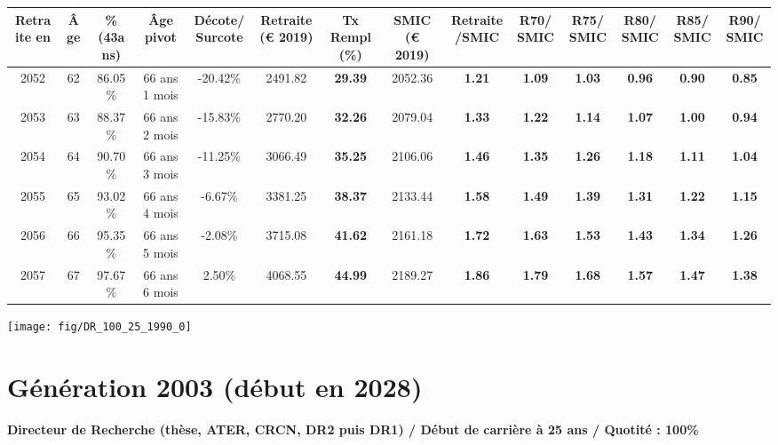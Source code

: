 \begin{adjustbox}{max width=\textwidth} 
\begin{tabular}[htb]{|c|c||c|c|c||c|c||c|c||c|c|c|c|c|} 
\hline 
 Retraite en &  Âge &  \%(43ans) &  Âge pivot &  Décote/Surcote &  Retraite (\euro{} 2019) &  Tx Rempl(\%) &  SMIC (\euro{} 2019) &  Retraite/SMIC &  R70/SMIC &  R75/SMIC &  R80/SMIC &  R85/SMIC &  R90/SMIC \\ 
\hline \hline 
 2052 &  62 &  86.05\% &  66 ans 1 mois &  -20.42\% &  2491.82 &  {\bf 29.39} &  2052.36 &  {\bf 1.21} &  {\bf 1.09} &  {\bf 1.03} &  {\bf {\color{red} 0.96}} &  {\bf {\color{red} 0.90}} &  {\bf {\color{red} 0.85}} \\ 
\hline 
 2053 &  63 &  88.37\% &  66 ans 2 mois &  -15.83\% &  2770.20 &  {\bf 32.26} &  2079.04 &  {\bf 1.33} &  {\bf 1.22} &  {\bf 1.14} &  {\bf 1.07} &  {\bf 1.00} &  {\bf {\color{red} 0.94}} \\ 
\hline 
 2054 &  64 &  90.70\% &  66 ans 3 mois &  -11.25\% &  3066.49 &  {\bf 35.25} &  2106.06 &  {\bf 1.46} &  {\bf 1.35} &  {\bf 1.26} &  {\bf 1.18} &  {\bf 1.11} &  {\bf 1.04} \\ 
\hline 
 2055 &  65 &  93.02\% &  66 ans 4 mois &  -6.67\% &  3381.25 &  {\bf 38.37} &  2133.44 &  {\bf 1.58} &  {\bf 1.49} &  {\bf 1.39} &  {\bf 1.31} &  {\bf 1.22} &  {\bf 1.15} \\ 
\hline 
 2056 &  66 &  95.35\% &  66 ans 5 mois &  -2.08\% &  3715.08 &  {\bf 41.62} &  2161.18 &  {\bf 1.72} &  {\bf 1.63} &  {\bf 1.53} &  {\bf 1.43} &  {\bf 1.34} &  {\bf 1.26} \\ 
\hline 
 2057 &  67 &  97.67\% &  66 ans 6 mois &  2.50\% &  4068.55 &  {\bf 44.99} &  2189.27 &  {\bf 1.86} &  {\bf 1.79} &  {\bf 1.68} &  {\bf 1.57} &  {\bf 1.47} &  {\bf 1.38} \\ 
\hline 
\hline 
\end{tabular} 
\end{adjustbox} 
 
 \vspace{0.1cm} 

 {\hspace{-2.2cm}\texttt{[image: fig/DR\_100\_25\_1990\_0]}} 

\newpage 
 
\section{Génération 2003 (début en 2028)\label{DR_100_25_2003_0}} 
 
{\bf \noindent Directeur de Recherche (thèse, ATER, CRCN, DR2 puis DR1) / Début de carrière à 25 ans / Quotité : 100\%}  ~ 

